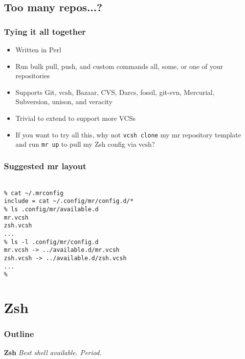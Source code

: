 \documentclass[t]{beamer}
\begin{document}
\subsection{Too many repos...?}

\begin{frame}
	\frametitle{Tying it all together}
	\begin{itemize}
		\item Written in Perl
		\item Run bulk pull, push, and custom commands all, some, or one of your repositories
		\item Supports Git, vcsh, Bazaar, CVS, Darcs, fossil, git-svn, Mercurial, Subversion, unison, and veracity
		\item Trivial to extend to support more VCSs
		\item If you want to try all this, why not \texttt{vcsh clone} my mr repository template and run \texttt{mr up} to pull my Zsh config via vcsh?
	\end{itemize}
\end{frame}

\begin{frame}
	\frametitle{Suggested mr layout}
	\texttt{ \\
		\% cat \~{}/.mrconfig \\
		include = cat \~{}/.config/mr/config.d/* \\
		\% ls .config/mr/available.d \\
		mr.vcsh \\
		zsh.vcsh \\
		... \\
		\% ls -l .config/mr/config.d \\
		mr.vcsh -> ../available.d/mr.vcsh \\
		zsh.vcsh -> ../available.d/zsh.vcsh \\
		... \\
		\%
	}
\end{frame}


\section{Zsh}

\begin{frame}
	\frametitle{Outline}
	\tableofcontents[currentsection]
\end{frame}

\begin{frame}
		\begin{center}
			\vfill
			\vfill
			\textbf{Zsh}
			\vfill
			\textit{Best shell available. Period.}
			\vfill
			\vfill
		\end{center}
\end{frame}
\end{document}
